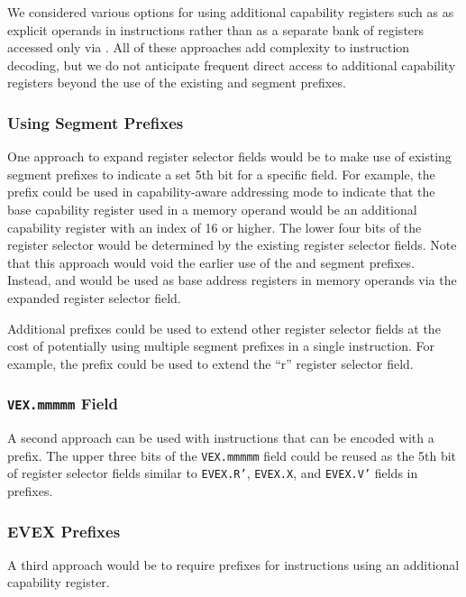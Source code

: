 We considered various options for using additional capability
registers such as \CGS{} as explicit operands in instructions rather
than as a separate bank of registers accessed only via
.  All of these approaches add complexity to
instruction decoding, but we do not anticipate frequent direct access
to additional capability registers beyond the use of the existing
\FS{} and \GS{} segment prefixes.

\subsubsection{Using Segment Prefixes}

One approach to expand register selector fields would be to make use
of existing segment prefixes to indicate a set 5th bit for a specific
field.  For example, the \GS{} prefix could be used in capability-aware
addressing mode to indicate that the base capability register used in
a memory operand would be an additional capability register with an
index of 16 or higher.  The lower four bits of the register selector
would be determined by the existing register selector fields.   Note
that this approach would void the earlier use of the \FS{} and \GS{}
segment prefixes.  Instead, \CFS{} and \CGS{} would be used as base
address registers in memory operands via the expanded register
selector field.

Additional prefixes could be used to extend other register selector
fields at the cost of potentially using multiple segment prefixes in a
single instruction.  For example, the \FS{} prefix could be used to
extend the ``r'' register selector field.

\subsubsection{\texttt{VEX.mmmmm} Field}

A second approach can be used with instructions that can be encoded
with a \VEX{} prefix.  The upper three bits of the \texttt{VEX.mmmmm}
field could be reused as the 5th bit of register selector fields
similar to \texttt{EVEX.R'}, \texttt{EVEX.X}, and \texttt{EVEX.V'}
fields in \EVEX{} prefixes.

\subsubsection{EVEX Prefixes}

A third approach would be to require \EVEX{} prefixes for instructions
using an additional capability register.

